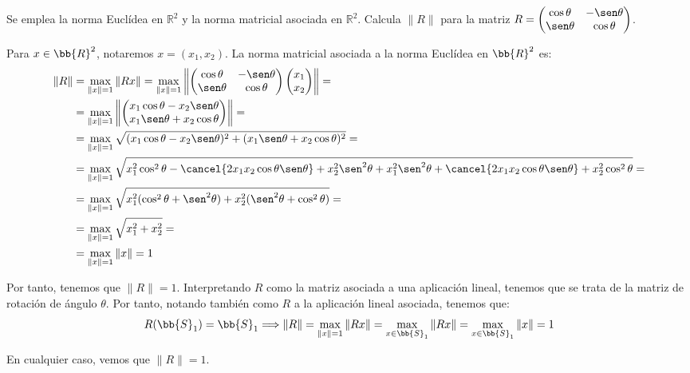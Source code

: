 \documentclass[12pt]{article}
\begin{document}
    \begin{ejercicio}
        Se emplea la norma Euclídea en $\mathbb{R}^2$ y la norma matricial asociada en $\mathbb{R}^2$. Calcula $\|R\|$ para la matriz $R=\displaystyle
        \begin{pmatrix}
            \cos\theta & -\sen\theta \\
            \sen\theta & \cos\theta
        \end{pmatrix}$.

        Para $x\in \bb{R}^2$, notaremos $x=(x_1,x_2)$. La norma matricial asociada a la norma Euclídea en $\bb{R}^2$ es:
        \begin{align*}
            \|R\|&=\max_{\|x\|=1}\|Rx\|=\max_{\|x\|=1}\left\|\begin{pmatrix}
                \cos\theta & -\sen\theta \\
                \sen\theta & \cos\theta
            \end{pmatrix}\begin{pmatrix}
                x_1 \\
                x_2
            \end{pmatrix}\right\|
            =\\&= \max_{\|x\|=1}\left\|\begin{pmatrix}
                x_1\cos\theta-x_2\sen\theta \\
                x_1\sen\theta+x_2\cos\theta
            \end{pmatrix}\right\|
            =\\&= \max_{\|x\|=1}\sqrt{(x_1\cos\theta-x_2\sen\theta)^2+(x_1\sen\theta+x_2\cos\theta)^2}
            =\\&= \max_{\|x\|=1}\sqrt{x_1^2\cos^2\theta-\cancel{2x_1x_2\cos\theta\sen\theta}+x_2^2\sen^2\theta+x_1^2\sen^2\theta+\cancel{2x_1x_2\cos\theta\sen\theta}+x_2^2\cos^2\theta}
            =\\&= \max_{\|x\|=1}\sqrt{x_1^2(\cos^2\theta+\sen^2\theta)+x_2^2(\sen^2\theta+\cos^2\theta)}
            =\\&= \max_{\|x\|=1}\sqrt{x_1^2+x_2^2}
            =\\&= \max_{\|x\|=1}\|x\|=1
        \end{align*}

        Por tanto, tenemos que $\|R\|=1$. Interpretando $R$ como la matriz asociada a una aplicación lineal, tenemos que se trata de la matriz de rotación de ángulo $\theta$. Por tanto, notando también como $R$ a la aplicación lineal asociada, tenemos que:
        \begin{equation*}
            R(\bb{S}_1)=\bb{S}_1
            \Longrightarrow \|R\|=\max_{\|x\|=1}\|Rx\|=\max_{x\in \bb{S}_1}\|Rx\|
            =\max_{x\in \bb{S}_1}\|x\|=1
        \end{equation*}

        En cualquier caso, vemos que $\|R\|=1$.
    \end{ejercicio}
\end{document}
